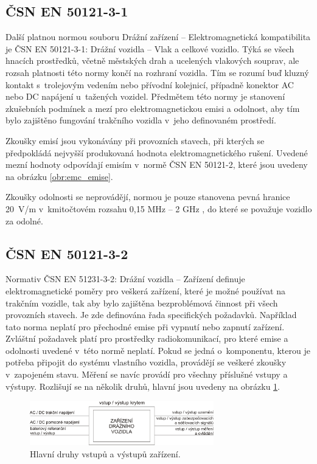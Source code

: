 \subsection{ČSN EN 50121-3-1}
Další platnou normou souboru Drážní zařízení – Elektromagnetická kompatibilita je ČSN EN 50121-3-1: Drážní vozidla – Vlak a celkové vozidlo. Týká se všech hnacích prostředků, včetně městských drah a ucelených vlakových souprav, ale rozsah platnosti této normy končí na rozhraní vozidla. Tím se rozumí buď kluzný kontakt s~trolejovým vedením nebo přívodní kolejnicí, případně konektor AC nebo DC napájení u~tažených vozidel. Předmětem této normy je stanovení zkušebních podmínek a mezí pro elektromagnetickou emisi a odolnost, aby tím bylo zajištěno fungování trakčního vozidla v~jeho definovaném prostředí. 

Zkoušky emisí jsou vykonávány při provozních stavech, při kterých se předpokládá nejvyšší produkovaná hodnota elektromagnetického rušení. Uvedené mezní hodnoty odpovídají emisím v~normě ČSN EN 50121-2, které jsou uvedeny na obrázku \ref{obr:emc_emise}.

Zkoušky odolnosti se neprovádějí, normou je pouze stanovena pevná hranice 20~V/m v~kmitočtovém rozsahu 0,15 MHz – 2 GHz , do které se považuje vozidlo za odolné.

\subsection{ČSN EN 50121-3-2}
Normativ ČSN EN 51231-3-2: Drážní vozidla – Zařízení definuje elektromagnetické poměry pro veškerá zařízení, které je možné používat na trakčním vozidle, tak aby bylo zajištěna bezproblémová činnost při všech provozních stavech. Je zde definována řada specifických požadavků. Například tato norma neplatí pro přechodné emise při vypnutí nebo zapnutí zařízení. Zvláštní požadavek platí pro prostředky radiokomunikací, pro které emise a odolnosti uvedené v~této normě neplatí. Pokud se jedná o~komponentu, kterou je potřeba připojit do systému vlastního vozidla, provádějí se veškeré zkoušky v~zapojeném stavu. Měření se navíc provádí pro všechny příslušné vstupy a výstupy. 
Rozlišují se na několik druhů, hlavní jsou uvedeny na obrázku \ref{obr:emc_IO}.

\begin{figure}[!h]
	\centering
	\includegraphics[width=8cm]{emc_IO.png}
	\caption{Hlavní druhy vstupů a výstupů zařízení.}
	\label{obr:emc_IO}
\end{figure}

